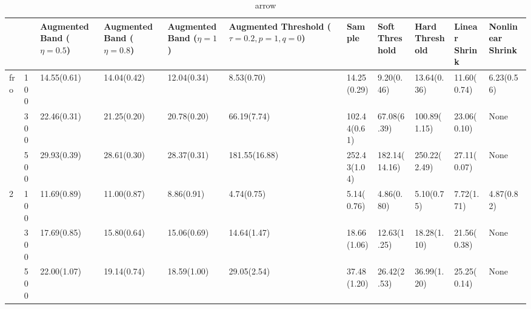 \begin{table}[htbp]
\centering
\caption{arrow}
\label{my label}
\begin{tabular}{ll|p{2cm}p{2cm}p{2cm}p{2cm}p{2cm}p{2cm}p{2cm}p{2cm}p{2cm}}
\toprule
  &     & Augmented Band ($\eta=0.5$) & Augmented Band ($\eta=0.8$) & Augmented Band ($\eta=1$) & Augmented Threshold ($\tau=0.2, p=1, q=0$) &        Sample & Soft Threshold & Hard Threshold & Linear Shrink & Nonlinear Shrink \\
\midrule
fro & 100 &                 14.55(0.61) &                 14.04(0.42) &               12.04(0.34) &                                 8.53(0.70) &   14.25(0.29) &     9.20(0.46) &    13.64(0.36) &   11.60(0.74) &       6.23(0.56) \\
  & 300 &                 22.46(0.31) &                 21.25(0.20) &               20.78(0.20) &                                66.19(7.74) &  102.44(0.61) &    67.08(6.39) &   100.89(1.15) &   23.06(0.10) &             None \\
  & 500 &                 29.93(0.39) &                 28.61(0.30) &               28.37(0.31) &                              181.55(16.88) &  252.43(1.04) &  182.14(14.16) &   250.22(2.49) &   27.11(0.07) &             None \\
2 & 100 &                 11.69(0.89) &                 11.00(0.87) &                8.86(0.91) &                                 4.74(0.75) &    5.14(0.76) &     4.86(0.80) &     5.10(0.75) &    7.72(1.71) &       4.87(0.82) \\
  & 300 &                 17.69(0.85) &                 15.80(0.64) &               15.06(0.69) &                                14.64(1.47) &   18.66(1.06) &    12.63(1.25) &    18.28(1.10) &   21.56(0.38) &             None \\
  & 500 &                 22.00(1.07) &                 19.14(0.74) &               18.59(1.00) &                                29.05(2.54) &   37.48(1.20) &    26.42(2.53) &    36.99(1.20) &   25.25(0.14) &             None \\
\bottomrule
\end{tabular}
\end{table}
